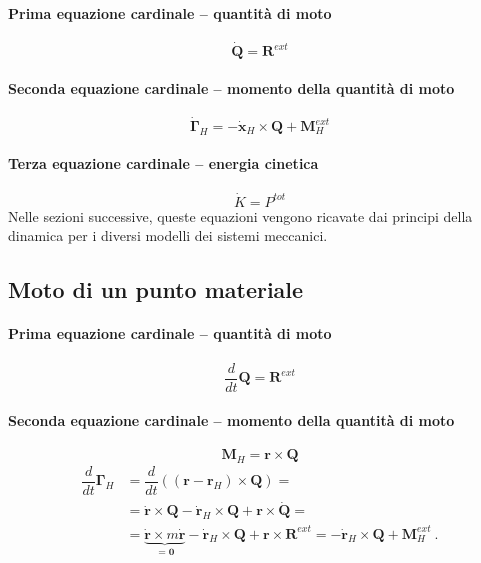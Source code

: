 \paragraph{Prima equazione cardinale -- quantità di moto}
\begin{equation}
    \dot{\mathbf{Q}} = \mathbf{R}^{ext}
\end{equation}
\paragraph{Seconda equazione cardinale -- momento della quantità di moto}
\begin{equation}
    \dot{\boldsymbol{\Gamma}}_H = - \dot{\mathbf{x}}_H \times \mathbf{Q} + \mathbf{M}_H^{ext}
\end{equation}
\paragraph{Terza equazione cardinale -- energia cinetica}
\begin{equation}
    \dot{K} = P^{tot}
\end{equation}
Nelle sezioni successive, queste equazioni vengono ricavate dai principi della dinamica per i diversi modelli dei sistemi meccanici.

\subsection{Moto di un punto materiale}
\paragraph{Prima equazione cardinale -- quantità di moto}
\begin{equation}
    \dfrac{d}{dt} \mathbf{Q} = \mathbf{R}^{ext}
\end{equation}

\paragraph{Seconda equazione cardinale -- momento della quantità di moto}
\begin{equation} \mathbf{M}_H = \mathbf{r} \times \mathbf{Q} \end{equation}
\begin{equation}
\begin{aligned}
    \dfrac{d}{dt} \mathbf{\Gamma}_H
    & = \dfrac{d}{dt} \left( (\mathbf{r} - \mathbf{r}_H ) \times \mathbf{Q} \right) = \\
    & = \dot{\mathbf{r}} \times \mathbf{Q} - \dot{\mathbf{r}}_H \times \mathbf{Q} + \mathbf{r} \times \dot{\mathbf{Q}} = \\
    & = \underbrace{\dot{\mathbf{r}} \times m \dot{\mathbf{r}}}_{=\mathbf{0}} - \dot{\mathbf{r}}_H \times \mathbf{Q} + \mathbf{r} \times \mathbf{R}^{ext} = - \dot{\mathbf{r}}_H \times \mathbf{Q} + \mathbf{M}_H^{ext} \ .
\end{aligned}
\end{equation}
